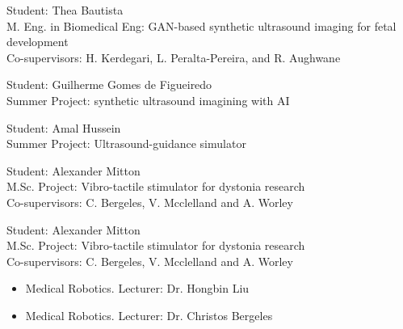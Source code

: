 \documentclass{mycv}
\begin{document}
Student: Thea Bautista  \\
M. Eng. in Biomedical Eng: GAN-based synthetic ultrasound imaging for fetal development \\
Co-supervisors: H. Kerdegari, L. Peralta-Pereira, and R. Aughwane

Student: Guilherme Gomes de Figueiredo  \\
Summer Project: synthetic ultrasound imagining with AI

Student: Amal Hussein  \\
Summer Project: Ultrasound-guidance simulator

Student: Alexander Mitton  \\
M.Sc. Project: Vibro-tactile stimulator for dystonia research \\
Co-supervisors: C. Bergeles, V. Mcclelland and A. Worley

Student: Alexander Mitton  \\
M.Sc. Project: Vibro-tactile stimulator for dystonia research \\
Co-supervisors: C. Bergeles, V. Mcclelland and A. Worley \\ 

\begin{positions}
\end{positions}
\begin{itemize}
	\item Medical Robotics. Lecturer: Dr. Hongbin Liu 
	\item Medical Robotics. Lecturer: Dr. Christos Bergeles 
\end{itemize}
\vspace{\parskip}
\end{document}
